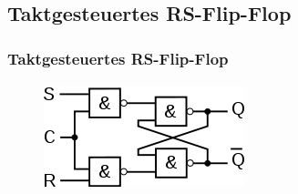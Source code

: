 \subsection{Taktgesteuertes RS-Flip-Flop} %
\label{sub:Taktgesteuertes RS-Flip-Flop}
\begin{frame}
    \frametitle{Taktgesteuertes RS-Flip-Flop}
    \framesubtitle{}
     \begin{figure}[H]
     \begin{center}
             \includegraphics[scale=0.6]{./img/schaltung/RS-FF-T.png}
     \end{center}
     \end{figure}
\end{frame}
